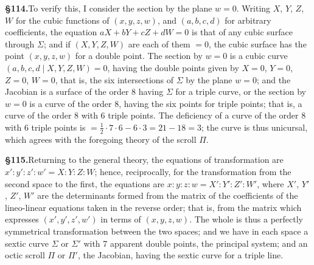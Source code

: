\documentclass[11pt,a4paper]{article}
\begin{document}
\textbf{\S 114.}\quad To verify this, I consider the section by the plane $w = 0$. Writing $X$, $Y$, $Z$, $W$ for the cubic functions of $(x, y, z, w)$, and $(a, b, c, d)$ for arbitrary coefficients, the equation $aX + bY + cZ + dW = 0$ is that of any cubic surface through $\Sigma$; and if $(X, Y, Z, W)$ are each of them $= 0$, the cubic surface has the point $(x, y, z, w)$ for a double point. The section by $w = 0$ is a cubic curve $(a, b, c, d \mid X, Y, Z, W) = 0$, having the double points given by $X = 0$, $Y = 0$, $Z = 0$, $W = 0$, that is, the six intersections of $\Sigma$ by the plane $w = 0$; and the Jacobian is a surface of the order 8 having $\Sigma$ for a triple curve, or the section by $w = 0$ is a curve of the order 8, having the six points for triple points; that is, a curve of the order 8 with 6 triple points. The deficiency of a curve of the order 8 with 6 triple points is $= \frac{1}{2} \cdot 7 \cdot 6 - 6 \cdot 3 = 21 - 18 = 3$; the curve is thus unicursal, which agrees with the foregoing theory of the scroll $\Pi$.

\textbf{\S 115.}\quad Returning to the general theory, the equations of transformation are $x' : y' : z' : w' = X : Y : Z : W$; hence, reciprocally, for the transformation from the second space to the first, the equations are $x : y : z : w = X' : Y' : Z' : W'$, where $X'$, $Y'$, $Z'$, $W'$ are the determinants formed from the matrix of the coefficients of the lineo-linear equations taken in the reverse order; that is, from the matrix which expresses $(x', y', z', w')$ in terms of $(x, y, z, w)$. The whole is thus a perfectly symmetrical transformation between the two spaces; and we have in each space a sextic curve $\Sigma$ or $\Sigma'$ with 7 apparent double points, the principal system; and an octic scroll $\Pi$ or $\Pi'$, the Jacobian, having the sextic curve for a triple line.
\end{document}
